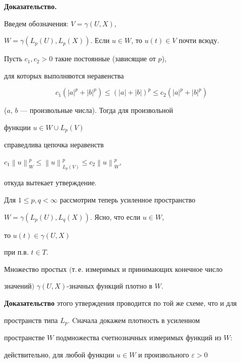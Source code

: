 {\bf Доказательство.}


Введем обозначения: $V = \gamma(U,X)$,


$W = \gamma(L_p(U), L_p(X))$. Если $u \in W$, то $u(t) \in V$ почти всюду.


Пусть $c_1, c_2 > 0$ такие постоянные (зависящие от $p$),


для которых выполняются неравенства


$$


c_1(|a|^p + |b|^p) \le (|a|+|b|)^p \le c_2(|a|^p + |b|^p)


$$


($a$, $b$ --- произвольные числа). Тогда для произвольной 


функции $u \in W \cup L_p(V)$


справедлива цепочка неравенств


$c_1{\left\| {u} \right\|}_W^{p} \le


{\left\| {u} \right\|}_{L_p(V)}^p \le c_2 {\left\| {u} \right\|}_W^{p}$,


откуда вытекает утверждение.


\medskip








Для $1 \le p,q < \infty$ рассмотрим теперь усиленное пространство


$W=\gamma(L_p(U), L_q(X))$. Ясно, что если $u \in W$,


то $u(t) \in \gamma(U,X)$


при п.в. $t \in T$.





\begin{lems} \label{ldensW}


Множество простых $($т.\,е. измеримых и принимающих конечное число


зна\-че\-ний$)$ $\gamma(U,X)$-знач\-ных функций плотно в $W$.


\end{lems}





{\bf Доказательство} этого утверждения проводится по той же схеме, что и для


пространств типа $L_p$. Cначала докажем плотность в усиленном


пространстве $W$ подмножества счетнозначных измеримых функций из $W$:


действительно, для любой функции $u \in W$ и произвольного $\varepsilon >0$



